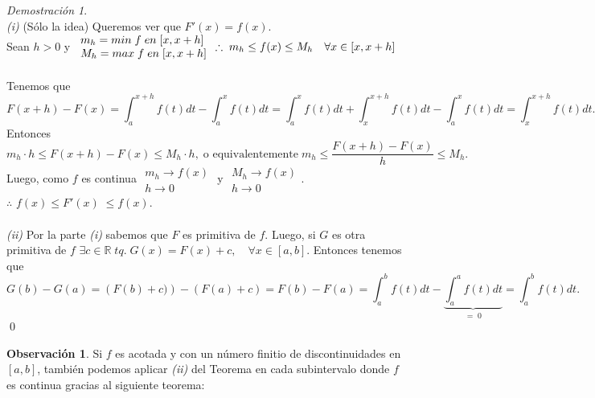 \documentclass{article}
\theoremstyle{definition}
\theoremstyle{definition}
\newtheorem*{obs}{Observación}
\theoremstyle{remark}
\newtheorem*{demo}{Demostración}
\newcommand\R{\ensuremath{\mathbb{R}}}
\begin{document}
\begin{demo} \; \\
  \emph{(i)} (Sólo la idea) Queremos ver que $F'(x)=f(x).$ \\
  Sean $h>0$ y $
  \begin{array}{l}
m_h = min \; f \; en \;  [x,x+h] \\
M_h = max \; f \; en \;  [x,x+h]
    \end{array} \quad \\\\ \therefore \; m_h \leq f(x) \leq M_h \quad \forall x \in [x,x+h]$\\ \\
Tenemos que \\
\[
F(x+h)-F(x)=\int_{a}^{x+h}{f(t)dt} - \int_{a}^{x}{f(t)dt} = \int_{a}^{x}{f(t)dt}+\int_{x}^{x+h}{f(t)dt}-\int_{a}^{x}{f(t)dt}=\int_{x}^{x+h}{f(t)dt.}
\]
Entonces
\[
m_h\cdot h \leq F(x+h) -F(x) \leq M_h\cdot h, \; \text{o equivalentemente} \; m_h \leq \frac{F(x+h)-F(x)}{h} \leq M_h.
\]
Luego, como $f$ es continua $\begin{array}{c}
m_h \to f(x) \\
h \to 0\phantom{x}
\end{array}$ y $\begin{array}{c}
  M_h \to f(x) \\
  h \to 0\phantom{x}
\end{array}$.\\
 $\therefore$ $f(x) \leq F'(x)\; \leq f(x)$.
\\
\\
\emph{(ii)} Por la parte \emph{(i)} sabemos que $F$ es primitiva de $f$. Luego, si $G$ es otra primitiva de $f$ $\exists c \in \R \; tq. \; G(x)=F(x)+c, \quad \forall x \in [a,b]$.  Entonces tenemos que \[
G(b)-G(a)=\left(F(b)+c)\right) - \left( F(a)+c \right) = F(b)-F(a)=\int_{a}^{b}{f(t)dt}-\underbrace{\int_{a}^{a}{f(t)dt}}_{=\;0}=\int_{a}^{b}{f(t)dt}.
\] \qed
\end{demo}
\begin{obs}
  Si $f$ es acotada y con un número finitio de discontinuidades en $[a,b]$, también podemos aplicar \emph{(ii)} del Teorema en cada subintervalo donde $f$ es continua gracias al siguiente teorema:
\end{obs}
\end{document}
